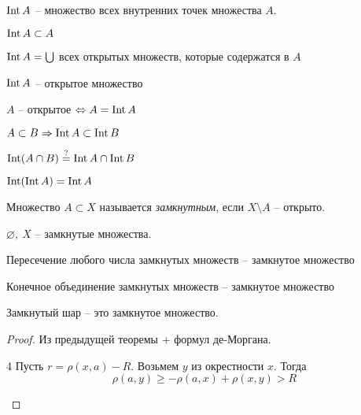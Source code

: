     \begin{notation}
        $\operatorname{Int} A$ -- множество всех внутренних точек множества $A$. 
    \end{notation}

    \begin{Thm}[Свойства]
        \begin{MyList}
            \item $\operatorname{Int} A \subset A$
            \item $\operatorname{Int} A = \bigcup$ всех открытых множеств, которые содержатся в $A$
            \item $\operatorname{Int} A$ -- открытое множество
            \item $A$ -- открытое $\Leftrightarrow A = \operatorname{Int} A$
            \item $A \subset B \Rightarrow \operatorname{Int} A \subset \operatorname{Int} B$
            \item $\operatorname{Int} (A \cap B) \stackrel{?}{=} \operatorname{Int} A \cap \operatorname{Int} B$
            \item $\operatorname{Int} (\operatorname{Int} A) = \operatorname{Int} A$   
        \end{MyList}
    \end{Thm}

    \begin{Def}
        Множество $A \subset X$ называется \textit{замкнутным}, если $X \setminus A$ -- открыто.
    \end{Def}

    \begin{Thm}
        \begin{MyList}
            \item $\varnothing, \ X$ -- замкнутые множества.
            \item Пересечение любого числа замкнутых множеств -- замкнутое множество
            \item Конечное объединение замкнутых множеств -- замкнутое множество
            \item Замкнутый шар -- это замкнутое множество.
        \end{MyList}
    \end{Thm}

    \begin{proof}
        Из предыдущей теоремы + формул де-Моргана.
        \TODO
        \begin{MyList}
            \item[4] Пусть $r = \rho (x, a) - R$. Возьмем $y$ из окрестности $x$. Тогда
            \[\rho (a, y) \geqslant -\rho(a, x) + \rho(x, y) > R\]
        \end{MyList}
    \end{proof}

